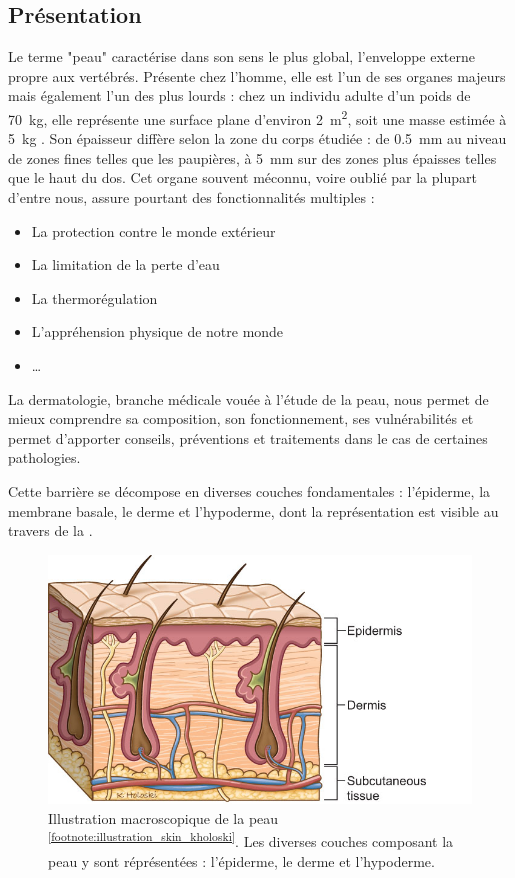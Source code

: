 \subsection{Présentation}
Le terme "peau" caractérise dans son sens le plus global, l’enveloppe externe propre aux vertébrés. Présente chez l’homme, elle est l’un de ses organes majeurs mais également l’un des plus lourds : chez un individu adulte d’un poids de \SI{70}{\kilo\gram}, elle représente une surface plane d’environ \SI{2}{\metre\squared}, soit une masse estimée à \SI{5}{\kilo\gram} \cite{McGrath2010}. Son épaisseur diffère selon la zone du corps étudiée : de \SI{0,5}{\milli\metre} au niveau de zones fines telles que les paupières, à \SI{5}{\milli\metre} sur des zones plus épaisses telles que le haut du dos. Cet organe souvent méconnu, voire oublié par la plupart d’entre nous, assure pourtant des fonctionnalités multiples : 
\begin{itemize}
\item La protection contre le monde extérieur
\item La limitation de la perte d’eau
\item La thermorégulation
\item L’appréhension physique de notre monde
\item \ldots
\end{itemize}\par
La dermatologie, branche médicale vouée à l’étude de la peau, nous permet de mieux comprendre sa composition, son fonctionnement, ses vulnérabilités et permet d’apporter conseils, préventions et traitements dans le cas de certaines pathologies.\par
Cette barrière se décompose en diverses couches fondamentales : l’épiderme, la membrane basale, le derme et l’hypoderme, dont la représentation est visible au travers de la .\par
\begin{figure}[H]
    \centering
    \includegraphics[width=0.6\linewidth]{contents/chapter_1/resources/illustration_skin_kholoski.png}
    \caption{Illustration macroscopique de la peau \textsuperscript{\ref{footnote:illustration_skin_kholoski}}. Les diverses couches composant la peau y sont réprésentées : l'épiderme, le derme et l'hypoderme.}
    \label{fig:illustration_skin_kholoski}
\end{figure}
\addtocounter{footnote}{1}
\clearpage

